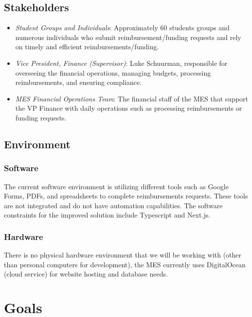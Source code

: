 \documentclass{article}
\begin{document}
\subsection{Stakeholders}

\begin{itemize}
    \item \emph{Student Groups and Individuals}: Approximately 60 students groups and numerous individuals who submit reimbursement/funding requests and rely on timely and efficient reimbursements/funding.
    \item \emph{Vice President, Finance (Supervisor)}: Luke Schuurman, responsible for overseeing the financial operations, managing budgets, processing reimbursements, and ensuring compliance.
    \item \emph{MES Financial Operations Team}: The financial staff of the MES that support the VP Finance with daily operations such as processing reimbursements or funding requests. 
\end{itemize}

\subsection{Environment}


\subsubsection{Software}
The current software environment is utilizing different tools such as Google Forms, PDFs, and spreadsheets to complete reimbursements requests. These tools are not integrated and do not have automation capabilities. The software constraints for the improved solution include Typescript and Next.js. 

\subsubsection{Hardware}
There is no physical hardware environment that we will be working with (other than personal computers for development), the MES currently uses DigitalOcean (cloud service) for website hosting and database needs.

\section{Goals}
\end{document}

